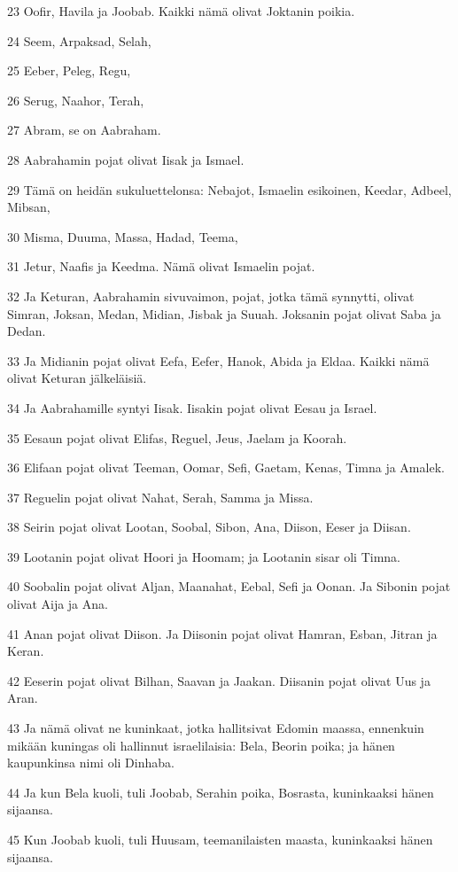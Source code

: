 \par 23 Oofir, Havila ja Joobab. Kaikki nämä olivat Joktanin poikia.
\par 24 Seem, Arpaksad, Selah,
\par 25 Eeber, Peleg, Regu,
\par 26 Serug, Naahor, Terah,
\par 27 Abram, se on Aabraham.
\par 28 Aabrahamin pojat olivat Iisak ja Ismael.
\par 29 Tämä on heidän sukuluettelonsa: Nebajot, Ismaelin esikoinen, Keedar, Adbeel, Mibsan,
\par 30 Misma, Duuma, Massa, Hadad, Teema,
\par 31 Jetur, Naafis ja Keedma. Nämä olivat Ismaelin pojat.
\par 32 Ja Keturan, Aabrahamin sivuvaimon, pojat, jotka tämä synnytti, olivat Simran, Joksan, Medan, Midian, Jisbak ja Suuah. Joksanin pojat olivat Saba ja Dedan.
\par 33 Ja Midianin pojat olivat Eefa, Eefer, Hanok, Abida ja Eldaa. Kaikki nämä olivat Keturan jälkeläisiä.
\par 34 Ja Aabrahamille syntyi Iisak. Iisakin pojat olivat Eesau ja Israel.
\par 35 Eesaun pojat olivat Elifas, Reguel, Jeus, Jaelam ja Koorah.
\par 36 Elifaan pojat olivat Teeman, Oomar, Sefi, Gaetam, Kenas, Timna ja Amalek.
\par 37 Reguelin pojat olivat Nahat, Serah, Samma ja Missa.
\par 38 Seirin pojat olivat Lootan, Soobal, Sibon, Ana, Diison, Eeser ja Diisan.
\par 39 Lootanin pojat olivat Hoori ja Hoomam; ja Lootanin sisar oli Timna.
\par 40 Soobalin pojat olivat Aljan, Maanahat, Eebal, Sefi ja Oonan. Ja Sibonin pojat olivat Aija ja Ana.
\par 41 Anan pojat olivat Diison. Ja Diisonin pojat olivat Hamran, Esban, Jitran ja Keran.
\par 42 Eeserin pojat olivat Bilhan, Saavan ja Jaakan. Diisanin pojat olivat Uus ja Aran.
\par 43 Ja nämä olivat ne kuninkaat, jotka hallitsivat Edomin maassa, ennenkuin mikään kuningas oli hallinnut israelilaisia: Bela, Beorin poika; ja hänen kaupunkinsa nimi oli Dinhaba.
\par 44 Ja kun Bela kuoli, tuli Joobab, Serahin poika, Bosrasta, kuninkaaksi hänen sijaansa.
\par 45 Kun Joobab kuoli, tuli Huusam, teemanilaisten maasta, kuninkaaksi hänen sijaansa.
